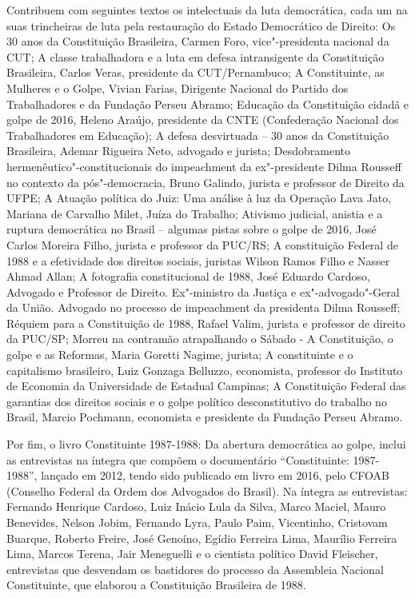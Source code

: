 Contribuem com seguintes textos os intelectuais da luta democrática, cada um na suas trincheiras de luta pela restauração do Estado Democrático de Direito: Os 30 anos da Constituição Brasileira, Carmen Foro, vice"-presidenta nacional da CUT; A classe trabalhadora e a luta em defesa intransigente da Constituição Brasileira, Carlos Veras, presidente da CUT/Pernambuco; A Constituinte, as Mulheres e o Golpe, Vivian Farias, Dirigente Nacional do Partido dos Trabalhadores e da Fundação Perseu Abramo; Educação da Constituição cidadã e golpe de 2016, Heleno Araújo, presidente da CNTE (Confederação Nacional dos Trabalhadores em Educação); A defesa desvirtuada – 30 anos da Constituição Brasileira, Ademar Rigueira Neto, advogado e jurista; Desdobramento hermenêutico"-constitucionais do impeachment da ex"-presidente Dilma Rousseff no contexto da pós"-democracia, Bruno Galindo, jurista e professor de Direito da UFPE; A Atuação política do Juiz: Uma análise à luz da Operação Lava Jato, Mariana de Carvalho Milet, Juíza do Trabalho; Ativismo judicial, anistia e a ruptura democrática no Brasil – algumas pistas sobre o golpe de 2016, José Carlos Moreira Filho, jurista e professor da PUC/RS;  A constituição  Federal de 1988 e a efetividade dos direitos sociais,  juristas Wilson Ramos Filho e Nasser Ahmad Allan;  A fotografia constitucional de 1988, José Eduardo Cardoso, Advogado e Professor de Direito. Ex"-ministro da Justiça e ex"-advogado"-Geral da União. Advogado no processo de impeachment da presidenta Dilma Rousseff; Réquiem para a Constituição de 1988, Rafael Valim, jurista e professor de direito da PUC/SP; Morreu na contramão atrapalhando o Sábado - A Constituição, o golpe e as Reformas, Maria Goretti Nagime, jurista; A constituinte e o capitalismo brasileiro, Luiz Gonzaga Belluzzo, economista, professor do Instituto de Economia da Universidade de Estadual Campinas; A Constituição Federal das garantias dos direitos sociais e o golpe político desconstitutivo do trabalho no Brasil, Marcio Pochmann, economista e presidente da Fundação Perseu Abramo.

Por fim, o livro Constituinte 1987-1988: Da abertura democrática ao golpe, inclui as entrevistas na íntegra que compõem o documentário “Constituinte: 1987-1988”, lançado em 2012, tendo sido publicado em livro em 2016, pelo CFOAB (Conselho Federal da Ordem dos Advogados do Brasil). Na íntegra as entrevistas: Fernando Henrique Cardoso, Luiz Inácio Lula da Silva, Marco Maciel, Mauro Benevides, Nelson Jobim, Fernando Lyra, Paulo Paim, Vicentinho, Cristovam Buarque, Roberto Freire, José Genoíno, Egídio Ferreira Lima, Maurílio Ferreira Lima, Marcos Terena, Jair Meneguelli e o cientista político David Fleischer, entrevistas que desvendam os bastidores do processo da Assembleia Nacional Constituinte, que elaborou a Constituição Brasileira de 1988.

